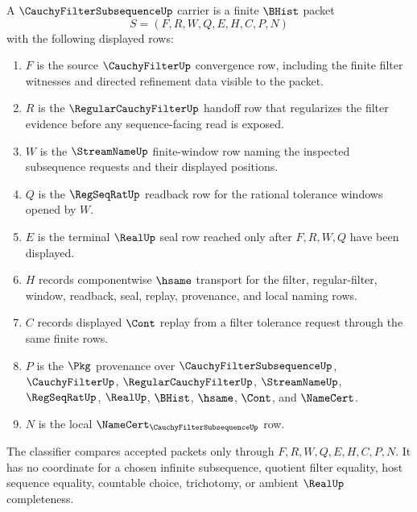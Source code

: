 \begin{definition}
\label{def:cauchy-filter-subsequence-carrier}
A $\CauchyFilterSubsequenceUp$ carrier is a finite $\BHist$ packet
$$
S=(F,R,W,Q,E,H,C,P,N)
$$
with the following displayed rows:
\begin{enumerate}
\item $F$ is the source $\CauchyFilterUp$ convergence row, including the finite filter witnesses and directed refinement data visible to the packet.
\item $R$ is the $\RegularCauchyFilterUp$ handoff row that regularizes the filter evidence before any sequence-facing read is exposed.
\item $W$ is the $\StreamNameUp$ finite-window row naming the inspected subsequence requests and their displayed positions.
\item $Q$ is the $\RegSeqRatUp$ readback row for the rational tolerance windows opened by $W$.
\item $E$ is the terminal $\RealUp$ seal row reached only after $F,R,W,Q$ have been displayed.
\item $H$ records componentwise $\hsame$ transport for the filter, regular-filter, window, readback, seal, replay, provenance, and local naming rows.
\item $C$ records displayed $\Cont$ replay from a filter tolerance request through the same finite rows.
\item $P$ is the $\Pkg$ provenance over $\CauchyFilterSubsequenceUp$, $\CauchyFilterUp$, $\RegularCauchyFilterUp$, $\StreamNameUp$, $\RegSeqRatUp$, $\RealUp$, $\BHist$, $\hsame$, $\Cont$, and $\NameCert$.
\item $N$ is the local $\NameCert_{\CauchyFilterSubsequenceUp}$ row.
\end{enumerate}
The classifier compares accepted packets only through $F,R,W,Q,E,H,C,P,N$. It has no coordinate for a chosen infinite subsequence, quotient filter equality, host sequence equality, countable choice, trichotomy, or ambient $\RealUp$ completeness.
\end{definition}

